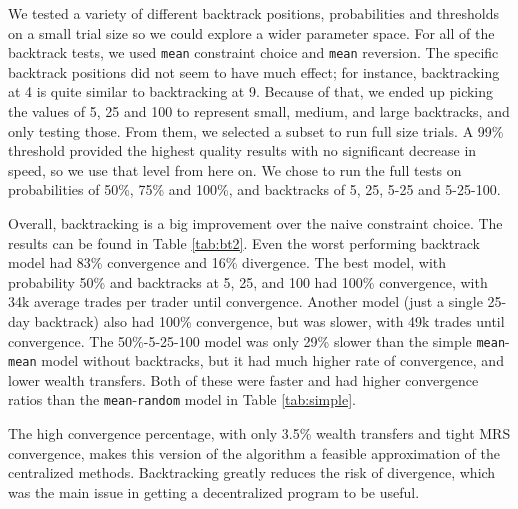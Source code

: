 \documentclass[12pt,a4paper,titlepage]{article}
\newcommand{\co}[1]{\texttt{#1}}
\begin{document}
We tested a variety of different backtrack positions, probabilities and thresholds on a small trial size so we could explore a wider parameter space.
For all of the backtrack tests, we used \co{mean} constraint choice and \co{mean} reversion.
The specific backtrack positions did not seem to have much effect; for instance, backtracking at 4 is quite similar to backtracking at 9. 
Because of that, we ended up picking the values of 5, 25 and 100 to represent small, medium, and large backtracks, and only testing those.
From them, we selected a subset to run full size trials.
A 99\% threshold provided the highest quality results with no significant decrease in speed, so we use that level from here on.
We chose to run the full tests on probabilities of 50\%, 75\% and 100\%, and backtracks of 5, 25, 5-25 and 5-25-100. 

Overall, backtracking is a big improvement over the naive constraint choice.
The results can be found in Table \ref{tab:bt2}.
Even the worst performing backtrack model had 83\% convergence and 16\% divergence.
The best model, with probability 50\% and backtracks at 5, 25, and 100 had 100\% convergence, with 34k average trades per trader until convergence.
Another model (just a single 25-day backtrack) also had 100\% convergence, but was slower, with 49k trades until convergence.
The 50\%-5-25-100 model was only 29\% slower than the simple \co{mean}-\co{mean} model without backtracks, but it had much higher rate of convergence, and lower wealth transfers.
Both of these were faster and had higher convergence ratios than the \co{mean}-\co{random} model in Table \ref{tab:simple}.

The high convergence percentage, with only 3.5\% wealth transfers and tight MRS convergence, makes this version of the algorithm a feasible approximation of the centralized methods. 
Backtracking greatly reduces the risk of divergence, which was the main issue in getting a decentralized program to be useful.
\end{document}
